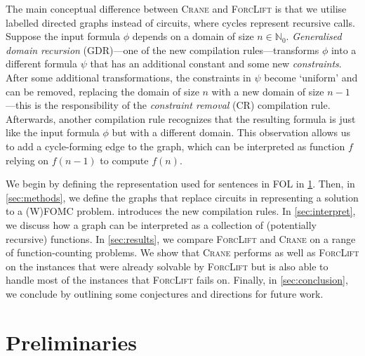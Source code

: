 \documentclass{article}
\theoremstyle{definition}
\begin{document}


The main conceptual difference between \textsc{Crane} and \textsc{ForcLift} is
that we utilise labelled directed graphs instead of circuits, where cycles
represent recursive calls. Suppose the input formula $\phi$ depends on a domain
of size $n \in \mathbb{N}_{0}$. \emph{Generalised domain recursion} (GDR)---one
of the new compilation rules---transforms $\phi$ into a different formula $\psi$
that has an additional constant and some new \emph{constraints}. After some
additional transformations, the constraints in $\psi$ become `uniform' and can
be removed, replacing the domain of size $n$ with a new domain of size
$n-1$---this is the responsibility of the \emph{constraint removal} (CR)
compilation rule. Afterwards, another compilation rule recognizes that the
resulting formula is just like the input formula $\phi$ but with a different
domain. This observation allows us to add a cycle-forming edge to the graph,
which can be interpreted as function $f$ relying on $f(n-1)$ to compute $f(n)$.


We begin by defining the representation used for sentences in FOL in
\cref{sec:recprelims}. Then, in \cref{sec:methods}, we define the graphs that
replace circuits in representing a solution to a (W)FOMC problem.
 introduces the new compilation rules. In \cref{sec:interpret},
we discuss how a graph can be interpreted as a collection of (potentially
recursive) functions. In \cref{sec:results}, we compare \textsc{ForcLift} and
\textsc{Crane} on a range of function-counting problems. We show that
\textsc{Crane} performs as well as \textsc{ForcLift} on the instances that were
already solvable by \textsc{ForcLift} but is also able to handle most of the
instances that \textsc{ForcLift} fails on. Finally, in \cref{sec:conclusion}, we
conclude by outlining some conjectures and directions for future work.

\section{Preliminaries}\label{sec:recprelims}
\end{document}
